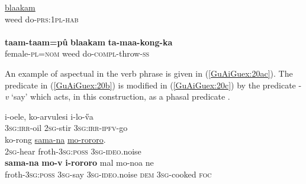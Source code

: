\documentclass[output=paper]{LSP/langsci}
\begin{document}
\begin{exe}
\ex \label{GuAiex:19ab}
\begin{xlist}
\ex \label{GuAiex:19a}
\gll \underline{blaakam}   \underline{}\\
weed     do-\textsc{prs:1pl-hab}\\
\glt {} \\
\ex \label{GuAiex:19b}
\gll  \textbf{taam-taam=pû}   \textbf{blaakam}   \textbf{ta-maa-kong-ka}\\
female-\textsc{pl=nom}   weed     do-\textsc{compl}{}-throw-\textsc{ss}\\
\glt {}
\end{xlist}
\end{exe}


An example of aspectual  in the verb phrase is given in (\ref{GuAiGuex:20ac}). The predicate in (\ref{GuAiGuex:20b}) is modified in (\ref{GuAiGuex:20c}) by the predicate -\textit{v} `say' which acts, in this construction, as a phasal predicate \citep[][342]{guerin11}.
\pagebreak

 \begin{exe}
 \ex \label{GuAiGuex:20ac}
\begin{xlist}
\ex \label{GuAiGuex:20a}
\gll    i-oele, ko-arvulesi i-lo-\H{v}a \\     	       
  \textsc{3sg:irr}-oil \textsc{2sg}-stir  \textsc{3sg:irr-ipfv}-go\\
\glt {} 
\ex \label{GuAiGuex:20b}
\gll   ko-rong     \underline{sama-na}               \underline{mo-rororo}.             \\     	       
 \textsc{2sg}-hear  froth-\textsc{3sg:poss}     \textsc{3sg}-\textsc{ideo}.noise \\
\glt {} 
\ex \label{GuAiGuex:20c}
\gll     \textbf{sama-na}  \textbf{ mo-v }           \textbf{i-rororo}     mal  mo-noa         ne     \\     	       
 froth-\textsc{3sg:poss}  \textsc{3sg}-say   \textsc{3sg}-\textsc{ideo}.noise \textsc{dem}  \textsc{3sg}-cooked   \textsc{foc}  \\
\glt {} 
\end{xlist}
\end{exe}
\end{document}
